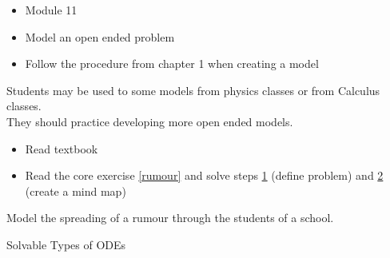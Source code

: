 \bookonlynewpage

\begin{lesson}

	\begin{itemize}
		\item Module 11
	\end{itemize}

	\begin{itemize}
		\item Model an open ended problem
		\item Follow the procedure from chapter 1 when creating a model
	\end{itemize}
	

Students may be used to some models from physics classes or from Calculus classes. \\

They should practice developing more open ended models.

\begin{itemize}
	\item Read textbook
	\item Read the core exercise \ref{rumour} and solve steps \hyperref[moddefine]{1} (define problem) and \hyperref[mindmap]{2} (create a mind map)
\end{itemize}

\end{lesson}


\question \label{rumour} Model the spreading of a rumour through the students of a school.






\standardonlynewpage



\begin{module}{Solvable Types of ODEs}

	\label{ODE:solve}

	
	

\end{module}


